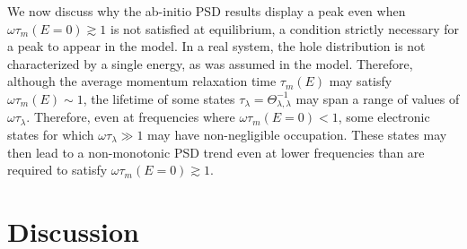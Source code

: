 \documentclass[aps,prx,preprint,letterpaper,groupedaddress,longbibliography]{revtex4-2}
\theoremstyle{definition}
\newcommand{\qnumber}{\lambda}
\begin{document}
We now discuss why the ab-initio PSD results display a peak even when $\omega\tau_m(E=0)\gtrsim 1$ is not satisfied at equilibrium, a condition strictly necessary for a peak to appear in the model. In a real system, the hole distribution is not characterized by a single energy, as was assumed in the model. Therefore, although the average momentum relaxation time $\tau_m(E)$ may satisfy $\omega\tau_m(E)\sim1$, the lifetime of some states $\tau_\qnumber = \Theta_{\qnumber, \qnumber}^{-1}$ may span a range of values of $\omega \tau_\qnumber$. Therefore, even at frequencies where $\omega\tau_m(E=0)<1$, some electronic states for which $\omega\tau_\qnumber\gg1$ may have non-negligible occupation. These states may then lead to a non-monotonic PSD trend even at lower frequencies than are required to satisfy $\omega\tau_m(E=0) \gtrsim 1$.




\section{Discussion}

\end{document}
